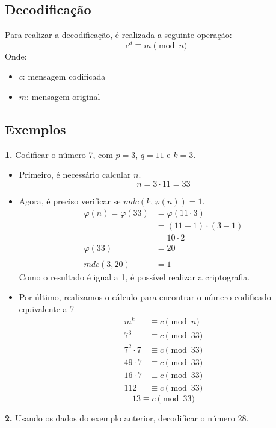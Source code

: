 \subsection{Decodificação}
Para realizar a decodificação, é realizada a seguinte operação:
\[
    c^{d} \equiv m \pmod {n}
\]
Onde:
\begin{itemize}
    \item $c$: mensagem codificada
    \item $m$: mensagem original
\end{itemize}

\subsection*{Exemplos}
\textbf{1.} Codificar o número 7, com $p = 3$, $q = 11$ e $k = 3$.

\begin{itemize}
    \item Primeiro, é necessário calcular $n$.
          \[
              n = 3 \cdot 11 = 33
          \]
    \item Agora, é preciso verificar se $mdc(k, \varphi(n)) = 1$.
          \begin{align*}
              \varphi(n) = \varphi(33) & = \varphi(11 \cdot 3)    \\
                                       & = (11 - 1) \cdot (3 - 1) \\
                                       & = 10 \cdot 2             \\
              \varphi(33)              & = 20
              \\
              \\
              mdc(3, 20)               & = 1
          \end{align*}
          Como o resultado é igual a 1, é possível realizar a criptografia.
    \item Por último, realizamos o cálculo para encontrar o número codificado equivalente a 7
          \begin{align*}
              m^{k}         & \equiv c \pmod {n}  \\
              7^{3}         & \equiv c \pmod {33} \\
              7^{2} \cdot 7 & \equiv c \pmod {33} \\
              49 \cdot 7    & \equiv c \pmod {33} \\
              16 \cdot 7    & \equiv c \pmod {33} \\
              112           & \equiv c \pmod {33}
          \end{align*}
          \[
              \boxed{
                  13 \equiv c \pmod {33}
              }
          \]
\end{itemize}
\vspace{24pt}
\textbf{2.} Usando os dados do exemplo anterior, decodificar o número 28.

